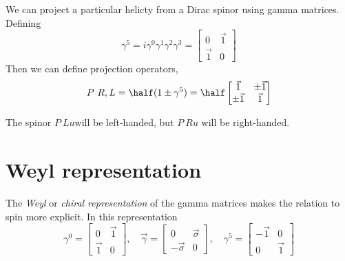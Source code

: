 We can project a particular helicty from a Dirac spinor using gamma matrices. Defining
\begin{equation}
  \label{eq:97}
  \gamma^5 = i \gamma^0 \gamma^1 \gamma^2 \gamma^3 =
  \begin{bmatrix}
    0&\vec{1}\\\vec{1}&0
  \end{bmatrix}
\end{equation}
Then we can define projection operators,
\begin{equation}
  \label{eq:98}
  P~{R,L} = \half(1\pm\gamma^5) = \half
  \begin{bmatrix}
    \vec{1} & \pm \vec{1} \\ \pm \vec{1} & \vec{1}
  \end{bmatrix}
\end{equation}

The spinor $P~Lu$will be left-handed, but $P~R u$ will be
right-handed.

\section{Weyl representation}
\label{sec:weyl-representation}

The \emph{Weyl} or \emph{chiral representation} of the gamma matrices
makes the relation to spin more explicit. In this representation
\[ \gamma^0 = \begin{bmatrix}  0&\vec{1}\\\vec{1}&0 \end{bmatrix},
\quad \vec{\gamma} = \begin{bmatrix} 0 & \vec{\sigma} \\ - \vec{\sigma} & 0 \end{bmatrix}, 
\quad \gamma^5 = 
\begin{bmatrix}  -\vec{1} & 0 \\ 0 & \vec{1}\end{bmatrix} \]

